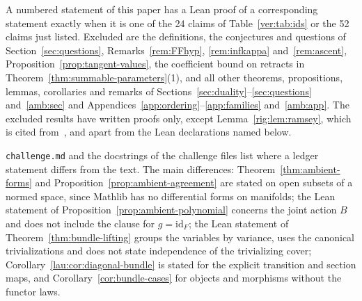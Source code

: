 \documentclass[11pt]{amsart}
\theoremstyle{definition}
\theoremstyle{remark}
\numberwithin{equation}{section}
\newcommand{\id}{\mathrm{id}}
\theoremstyle{plain}
\theoremstyle{definition}
\theoremstyle{plain}
\begin{document}
A numbered statement of this paper has a Lean proof of a corresponding statement exactly when it is one of the 24
claims of Table~\ref{ver:tab:ids} or the 52 claims just listed. Excluded are the definitions, the conjectures and
questions of Section~\ref{sec:questions}, Remarks~\ref{rem:FFhyp}, \ref{rem:infkappa} and~\ref{rem:ascent},
Proposition~\ref{prop:tangent-values}, the coefficient bound on retracts in Theorem~\ref{thm:summable-parameters}(1),
and all other theorems, propositions, lemmas, corollaries and remarks of
Sections~\ref{sec:duality}--\ref{sec:questions} and~\ref{amb:sec} and Appendices~\ref{app:ordering}--\ref{app:families}
and~\ref{amb:app}. The excluded
results have written proofs only, except Lemma~\ref{rig:lem:ramsey}, which is cited from~\cite{Ra}, and apart from the
Lean declarations named below.

\texttt{challenge.md} and the docstrings of the challenge files list where a ledger statement differs from the text.
The main differences: Theorem~\ref{thm:ambient-forms} and Proposition~\ref{prop:ambient-agreement} are stated on open
subsets of a normed space, since Mathlib has no differential forms on manifolds; the Lean statement of
Proposition~\ref{prop:ambient-polynomial} concerns the joint action $B$ and does not include the clause for $g=\id_F$; the Lean statement of
Theorem~\ref{thm:bundle-lifting} groups the variables by variance, uses the canonical trivializations and does not state
independence of the trivializing cover; Corollary~\ref{lau:cor:diagonal-bundle} is stated for the explicit transition
and section maps, and Corollary~\ref{cor:bundle-cases} for objects and morphisms without the functor laws.
\end{document}
